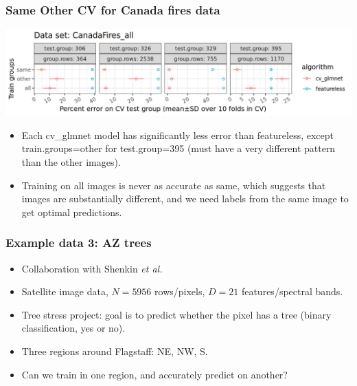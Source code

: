 \documentclass{beamer}
\begin{document}
\begin{frame}
  \frametitle{Same Other CV for Canada fires data}
  \includegraphics[width=\textwidth]{CanadaFires_all_error_glmnet_featureless_mean_SD.png}
  \begin{itemize}
  \item Each cv\_glmnet model has significantly less error than
    featureless, except train.groups=other for test.group=395 (must
    have a very different pattern than the other images).
  \item Training on all images is never as accurate as same, which
    suggests that images are substantially different, and we need
    labels from the same image to get optimal predictions.
  \end{itemize}
\end{frame}

\begin{frame}
  \frametitle{Example data 3: AZ trees}
  \begin{itemize}
  \item Collaboration with Shenkin \emph{et al.}
  \item Satellite image data, $N=5956$ rows/pixels, $D=21$
    features/spectral bands.
  \item Tree stress project: goal is to predict whether the pixel has
    a tree (binary classification, yes or no).
  \item Three regions around Flagstaff: NE, NW, S.
  \item Can we train in one region, and accurately predict on another?
  \end{itemize}
\end{frame}
\end{document}
